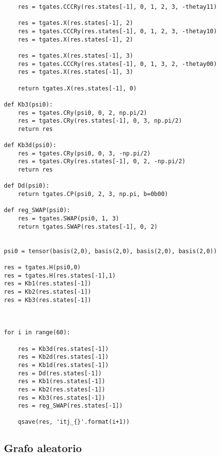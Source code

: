 \begin{verbatim}
    res = tgates.CCCRy(res.states[-1], 0, 1, 2, 3, -thetay11)

    res = tgates.X(res.states[-1], 2)
    res = tgates.CCCRy(res.states[-1], 0, 1, 2, 3, -thetay10)
    res = tgates.X(res.states[-1], 2)

    res = tgates.X(res.states[-1], 3)
    res = tgates.CCCRy(res.states[-1], 0, 1, 3, 2, -thetay00)
    res = tgates.X(res.states[-1], 3)

    return tgates.X(res.states[-1], 0)

def Kb3(psi0):
    res = tgates.CRy(psi0, 0, 2, np.pi/2)
    res = tgates.CRy(res.states[-1], 0, 3, np.pi/2)
    return res

def Kb3d(psi0):
    res = tgates.CRy(psi0, 0, 3, -np.pi/2)
    res = tgates.CRy(res.states[-1], 0, 2, -np.pi/2)
    return res

def Dd(psi0):
    return tgates.CP(psi0, 2, 3, np.pi, b=0b00)

def reg_SWAP(psi0):
    res = tgates.SWAP(psi0, 1, 3)
    return tgates.SWAP(res.states[-1], 0, 2)


psi0 = tensor(basis(2,0), basis(2,0), basis(2,0), basis(2,0))

res = tgates.H(psi0,0)
res = tgates.H(res.states[-1],1)
res = Kb1(res.states[-1])
res = Kb2(res.states[-1])
res = Kb3(res.states[-1])



for i in range(60):
    
    res = Kb3d(res.states[-1])
    res = Kb2d(res.states[-1])
    res = Kb1d(res.states[-1])
    res = Dd(res.states[-1])
    res = Kb1(res.states[-1])
    res = Kb2(res.states[-1])
    res = Kb3(res.states[-1])
    res = reg_SWAP(res.states[-1])
    
    qsave(res, 'itj_{}'.format(i+1))

\end{verbatim}

\subsection{Grafo aleatorio}

